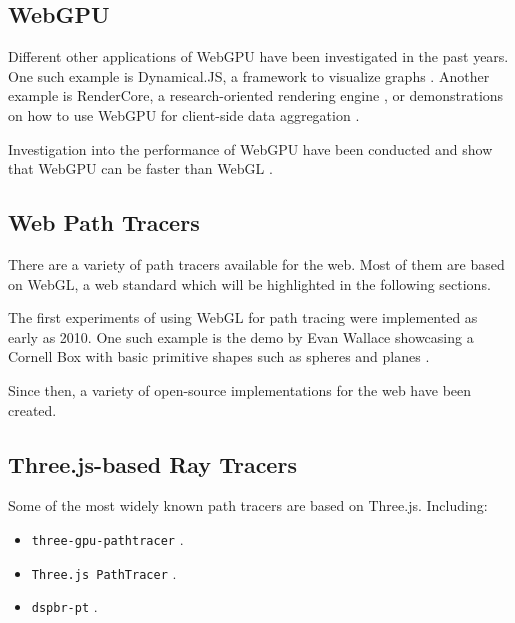 \subsection{WebGPU}

Different other applications of WebGPU have been investigated in the past years. One such example is Dynamical.JS, a framework to visualize graphs \cite{dotson2022dynamicaljs}. Another example is RenderCore, a research-oriented rendering engine \cite{Bohak_Kovalskyi_Linev_Mrak_Tadel_Strban_Tadel_Yagil_2024}, or demonstrations on how to use WebGPU for client-side data aggregation \cite{kimmersdorfer2023webgpu}.

Investigation into the performance of WebGPU have been conducted and show that WebGPU can be faster than WebGL \cite{fransson2023performance, CHICKERUR2024919}.
 

\subsection{Web Path Tracers}

There are a variety of path tracers available for the web. Most of them are based on WebGL, a web standard which will be highlighted in the following sections.

The first experiments of using WebGL for path tracing were implemented as early as 2010. One such example is the demo by Evan Wallace showcasing a Cornell Box with basic primitive shapes such as spheres and planes \cite{pathTracerWallace}.

Since then, a variety of open-source implementations for the web have been created.

\subsection{Three.js-based Ray Tracers}

Some of the most widely known path tracers are based on Three.js. Including:

\begin{itemize}
    \item {\texttt{three-gpu-pathtracer}} \cite{ThreeJsPathTracerJohnson}.
    \item{\texttt{Three.js PathTracer}} \cite{ThreeJsPathTracerLoftis}.
    \item {\texttt{dspbr-pt}} \cite{PathTracerDassault}.
  \end{itemize}
